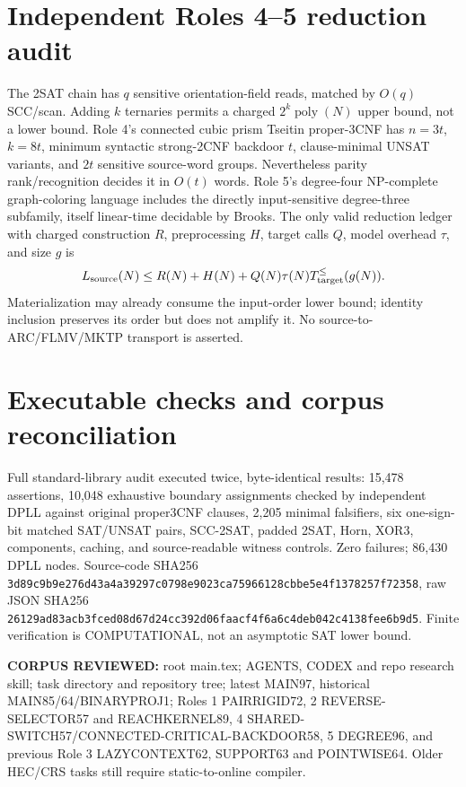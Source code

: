 \documentclass[11pt]{article}
\begin{document}
\section{Independent Roles 4--5 reduction audit}
The 2SAT chain has $q$ sensitive orientation-field reads, matched by $O(q)$ SCC/scan. Adding $k$ ternaries permits a charged $2^k\operatorname{poly}(N)$ upper bound, not a lower bound. Role 4's connected cubic prism Tseitin proper-3CNF has $n=3t$, $k=8t$, minimum syntactic strong-2CNF backdoor $t$, clause-minimal UNSAT variants, and $2t$ sensitive source-word groups. Nevertheless parity rank/recognition decides it in $O(t)$ words. Role 5's degree-four NP-complete graph-coloring language includes the directly input-sensitive degree-three subfamily, itself linear-time decidable by Brooks. The only valid reduction ledger with charged construction $R$, preprocessing $H$, target calls $Q$, model overhead $\tau$, and size $g$ is
\[
L_{\rm source}(N)\le R(N)+H(N)+Q(N)\tau(N)T_{\rm target}^{\le}(g(N)).
\]
Materialization may already consume the input-order lower bound; identity inclusion preserves its order but does not amplify it. No source-to-ARC/FLMV/MKTP transport is asserted.

\section{Executable checks and corpus reconciliation}
Full standard-library audit executed twice, byte-identical results: 15,478 assertions, 10,048 exhaustive boundary assignments checked by independent DPLL against original proper3CNF clauses, 2,205 minimal falsifiers, six one-sign-bit matched SAT/UNSAT pairs, SCC-2SAT, padded 2SAT, Horn, XOR3, components, caching, and source-readable witness controls. Zero failures; 86,430 DPLL nodes. Source-code SHA256 \texttt{3d89c9b9e276d43a4a39297c0798e9023ca75966128cbbe5e4f1378257f72358}, raw JSON SHA256 \texttt{26129ad83acb3fced08d67d24cc392d06faacf4f6a6c4deb042c4138fee6b9d5}. Finite verification is COMPUTATIONAL, not an asymptotic SAT lower bound.

\textbf{CORPUS REVIEWED:} root main.tex; AGENTS, CODEX and repo research skill; task directory and repository tree; latest MAIN97, historical MAIN85/64/BINARYPROJ1; Roles 1 PAIRRIGID72, 2 REVERSE-SELECTOR57 and REACHKERNEL89, 4 SHARED-SWITCH57/CONNECTED-CRITICAL-BACKDOOR58, 5 DEGREE96, and previous Role 3 LAZYCONTEXT62, SUPPORT63 and POINTWISE64. Older HEC/CRS tasks still require static-to-online compiler.
\end{document}
